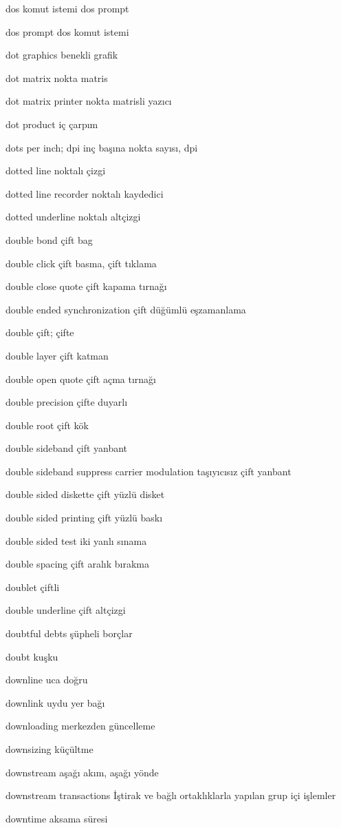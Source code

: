 \documentclass[12pt,fleqn]{article}\usepackage{../../common}
\begin{document}
dos komut istemi dos prompt

dos prompt dos komut istemi

dot graphics benekli grafik

dot matrix nokta matris

dot matrix printer nokta matrisli yazıcı

dot product iç çarpım

dots per inch; dpi inç başına nokta sayısı, dpi

dotted line noktalı çizgi

dotted line recorder noktalı kaydedici

dotted underline noktalı altçizgi

double bond çift bag

double click çift basma, çift tıklama

double close quote çift kapama tırnağı

double ended synchronization çift düğümlü eşzamanlama

double çift; çifte

double layer çift katman

double open quote çift açma tırnağı

double precision çifte duyarlı

double root çift kök

double sideband çift yanbant

double sideband suppress carrier modulation taşıyıcısız çift yanbant

double sided diskette çift yüzlü disket

double sided printing çift yüzlü baskı

double sided test iki yanlı sınama

double spacing çift aralık bırakma

doublet çiftli

double underline çift altçizgi

doubtful debts şüpheli borçlar

doubt kuşku

downline uca doğru

downlink uydu yer bağı

downloading merkezden güncelleme

downsizing küçültme

downstream aşağı akım, aşağı yönde

downstream transactions İştirak ve bağlı ortaklıklarla yapılan grup içi işlemler 

downtime aksama süresi
\end{document}
